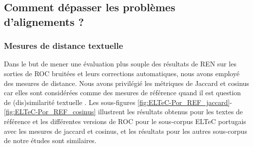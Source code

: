 \subsection{Comment dépasser les problèmes d'alignements ? }
\label{subsec:ditances_creux_COR-OCR-IMPACT-NER}
\subsubsection{Mesures de distance textuelle}

Dans le but de mener une évaluation plus souple des résultats de REN sur les sorties de ROC bruitées et leurs corrections automatiques, nous avons employé des mesures de distance. Nous avons privilégié les métriques de Jaccard et cosinus car elles sont considérées comme des mesures de référence quand il est question de (dis)similarité textuelle \cite{buscaldi2020calcul}. Les sous-figures \ref{fig:ELTeC-Por_REF_jaccard}-\ref{fig:ELTeC-Por_REF_cosinus} illustrent les résultats obtenus pour les textes de référence et les différentes versions de ROC pour le sous-corpus ELTeC portugais avec les mesures de jaccard et cosinus, et les résultats pour les autres sous-corpus de notre études sont similaires.

